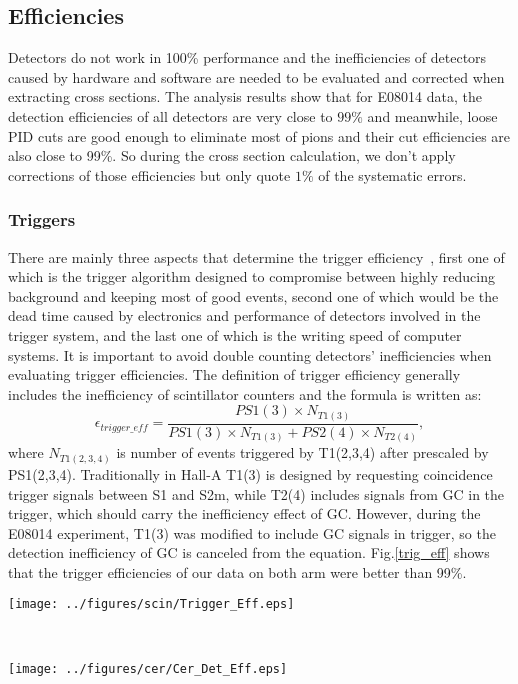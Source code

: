 \documentclass[a4paper,18.pt]{article}
\begin{document}
\subsection{Efficiencies}

Detectors do not work in 100\% performance and the inefficiencies of detectors caused by hardware and software are needed to be evaluated and corrected when extracting cross sections. The analysis results show that for E08014 data, the detection efficiencies of all detectors are very close to $99\%$ and meanwhile, loose PID cuts are good enough to eliminate most of pions and their cut efficiencies are also close to 99\%. So during the cross section calculation, we don't apply corrections of those efficiencies but only quote $1\%$ of the systematic errors.


\subsubsection{Triggers}

 There are mainly three aspects that determine the trigger efficiency~\cite{R_Bock}, first one of which is the trigger algorithm designed to compromise between highly reducing background and keeping most of good events, second one of which would be the dead time caused by electronics and performance of detectors involved in the trigger system, and the last one of which is the writing speed of computer systems. It is important to avoid double counting detectors' inefficiencies when evaluating trigger efficiencies. The definition of trigger efficiency generally includes the inefficiency of scintillator counters and the formula is written as:
\begin{equation}
 \epsilon_{trigger\_eff} = \frac{PS1(3)\times N_{T1(3)}}{PS1(3) \times N_{T1(3)}+PS2(4)\times N_{T2(4)}},
 \label{trigger_eff}
\end{equation}
where $N_{T1(2,3,4)}$ is number of events triggered by T1(2,3,4) after prescaled by PS1(2,3,4). Traditionally in Hall-A T1(3) is designed by requesting coincidence trigger signals between S1 and S2m, while T2(4) includes signals from GC in the trigger, which should carry the inefficiency effect of GC. However, during the E08014 experiment, T1(3) was modified to include GC signals in trigger, so the detection inefficiency of GC is canceled from the equation. Fig.\ref{trig_eff} shows that the trigger efficiencies of our data on both arm were better than 99\%.

 \begin{center}
\parbox[t]{0.8\textwidth}{
\centerline{\texttt{[image: ../figures/scin/Trigger\_Eff.eps]}}
\label{trig_eff}
}
\\
\parbox[t]{0.8\textwidth}{
\centerline{\texttt{[image: ../figures/cer/Cer\_Det\_Eff.eps]}}
\label{cer_det_eff}
}
 \end{center}
\end{document}

